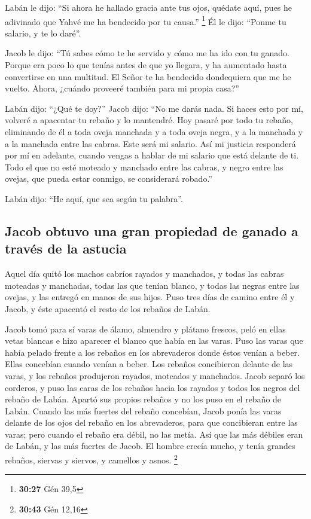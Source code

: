  Labán le dijo: ``Si ahora he hallado gracia ante tus
ojos, quédate aquí, pues he adivinado que Yahvé me ha bendecido por tu
causa.'' \footnote{\textbf{30:27} Gén 39,5}  Él le dijo:
``Ponme tu salario, y te lo daré''.

 Jacob le dijo: ``Tú sabes cómo te he servido y cómo me
ha ido con tu ganado.  Porque era poco lo que tenías
antes de que yo llegara, y ha aumentado hasta convertirse en una
multitud. El Señor te ha bendecido dondequiera que me he vuelto. Ahora,
¿cuándo proveeré también para mi propia casa?''

 Labán dijo: ``¿Qué te doy?'' Jacob dijo: ``No me darás
nada. Si haces esto por mí, volveré a apacentar tu rebaño y lo
mantendré.  Hoy pasaré por todo tu rebaño, eliminando de
él a toda oveja manchada y a toda oveja negra, y a la manchada y a la
manchada entre las cabras. Este será mi salario.  Así mi
justicia responderá por mí en adelante, cuando vengas a hablar de mi
salario que está delante de ti. Todo el que no esté moteado y manchado
entre las cabras, y negro entre las ovejas, que pueda estar conmigo, se
considerará robado.''

 Labán dijo: ``He aquí, que sea según tu palabra''.

\hypertarget{jacob-obtuvo-una-gran-propiedad-de-ganado-a-travuxe9s-de-la-astucia}{%
\subsection{Jacob obtuvo una gran propiedad de ganado a través de la
astucia}\label{jacob-obtuvo-una-gran-propiedad-de-ganado-a-travuxe9s-de-la-astucia}}

 Aquel día quitó los machos cabríos rayados y manchados,
y todas las cabras moteadas y manchadas, todas las que tenían blanco, y
todas las negras entre las ovejas, y las entregó en manos de sus hijos.
 Puso tres días de camino entre él y Jacob, y éste
apacentó el resto de los rebaños de Labán.

 Jacob tomó para sí varas de álamo, almendro y plátano
frescos, peló en ellas vetas blancas e hizo aparecer el blanco que había
en las varas.  Puso las varas que había pelado frente a
los rebaños en los abrevaderos donde éstos venían a beber. Ellas
concebían cuando venían a beber.  Los rebaños concibieron
delante de las varas, y los rebaños produjeron rayados, moteados y
manchados.  Jacob separó los corderos, y puso las caras
de los rebaños hacia los rayados y todos los negros del rebaño de Labán.
Apartó sus propios rebaños y no los puso en el rebaño de Labán.
 Cuando las más fuertes del rebaño concebían, Jacob ponía
las varas delante de los ojos del rebaño en los abrevaderos, para que
concibieran entre las varas;  pero cuando el rebaño era
débil, no las metía. Así que las más débiles eran de Labán, y las más
fuertes de Jacob.  El hombre crecía mucho, y tenía
grandes rebaños, siervas y siervos, y camellos y asnos. \footnote{\textbf{30:43}
  Gén 12,16}

